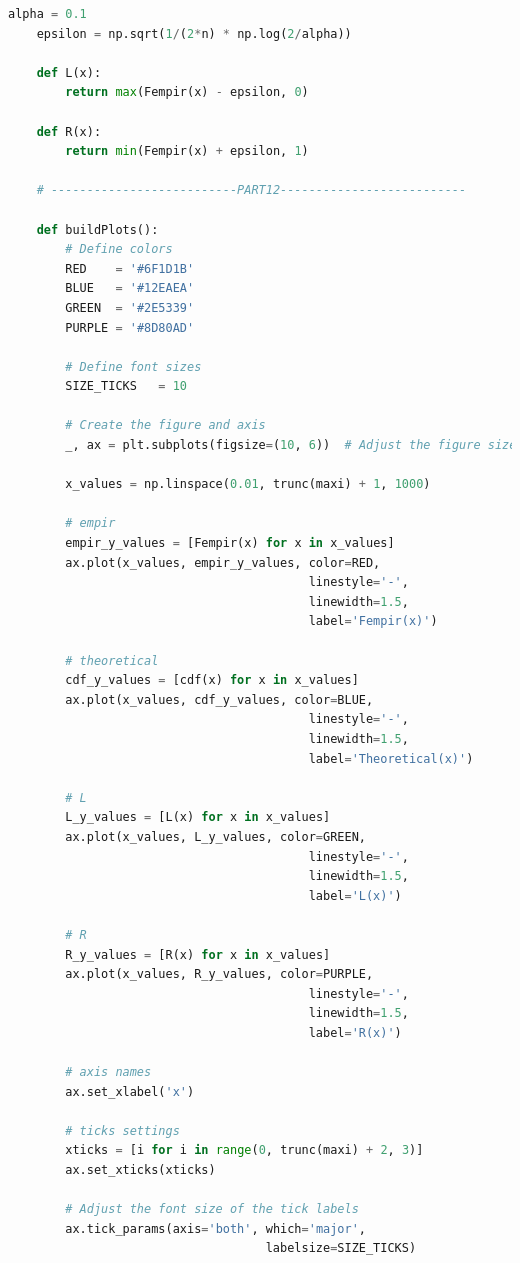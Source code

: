 \documentclass[a4paper, 14pt]{extarticle}
\begin{document}
\begin{center}
\begin{lstlisting}[language=Python]
    alpha = 0.1
    epsilon = np.sqrt(1/(2*n) * np.log(2/alpha))

    def L(x):
        return max(Fempir(x) - epsilon, 0)
    
    def R(x):
        return min(Fempir(x) + epsilon, 1)
    
    # --------------------------PART12--------------------------

    def buildPlots():
        # Define colors
        RED    = '#6F1D1B'
        BLUE   = '#12EAEA'
        GREEN  = '#2E5339'
        PURPLE = '#8D80AD'

        # Define font sizes
        SIZE_TICKS   = 10

        # Create the figure and axis
        _, ax = plt.subplots(figsize=(10, 6))  # Adjust the figure size as needed

        x_values = np.linspace(0.01, trunc(maxi) + 1, 1000)

        # empir
        empir_y_values = [Fempir(x) for x in x_values]
        ax.plot(x_values, empir_y_values, color=RED, 
                                          linestyle='-', 
                                          linewidth=1.5, 
                                          label='Fempir(x)')

        # theoretical
        cdf_y_values = [cdf(x) for x in x_values]
        ax.plot(x_values, cdf_y_values, color=BLUE, 
                                          linestyle='-', 
                                          linewidth=1.5, 
                                          label='Theoretical(x)')

        # L
        L_y_values = [L(x) for x in x_values]
        ax.plot(x_values, L_y_values, color=GREEN, 
                                          linestyle='-', 
                                          linewidth=1.5, 
                                          label='L(x)')

        # R
        R_y_values = [R(x) for x in x_values]
        ax.plot(x_values, R_y_values, color=PURPLE, 
                                          linestyle='-', 
                                          linewidth=1.5, 
                                          label='R(x)')

        # axis names
        ax.set_xlabel('x')

        # ticks settings
        xticks = [i for i in range(0, trunc(maxi) + 2, 3)]
        ax.set_xticks(xticks)

        # Adjust the font size of the tick labels
        ax.tick_params(axis='both', which='major', 
                                    labelsize=SIZE_TICKS)


\end{lstlisting}
\end{center}
\end{document}
